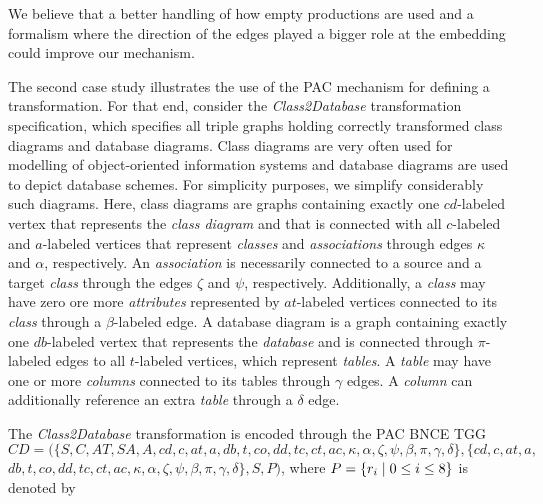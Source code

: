 We believe that a better handling of how empty productions are used and a formalism where the direction of the edges played a bigger role at the embedding could improve our mechanism.


The second case study illustrates the use of the PAC mechanism for defining a transformation. For that end, consider the \emph{Class2Database} transformation specification, which specifies all triple graphs holding correctly transformed class diagrams and database diagrams. Class diagrams are very often used for modelling of object-oriented information systems and database diagrams are used to depict database schemes. For simplicity purposes, we simplify considerably such diagrams. Here, class diagrams are graphs containing exactly one $cd$-labeled vertex that represents the \emph{class diagram} and that is connected with all $c$-labeled and $a$-labeled vertices that represent \emph{classes} and \emph{associations} through edges $\kappa$ and $\alpha$, respectively. An \emph{association} is necessarily connected to a source and a target \emph{class} through the edges $\zeta$ and $\psi$, respectively. Additionally, a \emph{class} may have zero ore more \emph{attributes} represented by $at$-labeled vertices connected to its \emph{class} through a $\beta$-labeled edge. A database diagram is a graph containing exactly one $db$-labeled vertex that represents the \emph{database} and is connected through $\pi$-labeled edges to all $t$-labeled vertices, which represent \emph{tables}. A \emph{table} may have one or more \emph{columns} connected to its tables through $\gamma$ edges. A \emph{column} can additionally reference an extra \emph{table} through a $\delta$ edge.

The \emph{Class2Database} transformation is encoded through the PAC BNCE TGG $CD = (\{S, C, AT, SA, A, cd, c, at, a, db, t, co, dd, tc, ct, ac, \kappa, \alpha, \zeta, \psi, \beta, \pi, \gamma, \delta\}, \{cd, c, at, a, $ $ db, t, co, dd, tc, ct, ac, \kappa, \alpha, \zeta, \psi, \beta, \pi, \gamma, \delta\}, S, P)$, where $P = \{r_i \; | \; 0 \le i \le 8\}$ is denoted by\\



